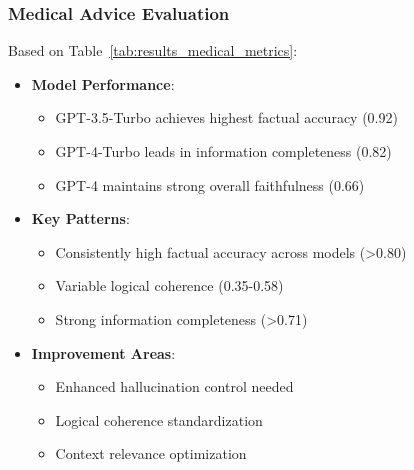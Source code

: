 \subsubsection{Medical Advice Evaluation}
Based on Table~\ref{tab:results_medical_metrics}:
\begin{itemize}
    \item \textbf{Model Performance}:
    \begin{itemize}
        \item GPT-3.5-Turbo achieves highest factual accuracy (0.92)
        \item GPT-4-Turbo leads in information completeness (0.82)
        \item GPT-4 maintains strong overall faithfulness (0.66)
    \end{itemize}
    \item \textbf{Key Patterns}:
    \begin{itemize}
        \item Consistently high factual accuracy across models (>0.80)
        \item Variable logical coherence (0.35-0.58)
        \item Strong information completeness (>0.71)
    \end{itemize}
    \item \textbf{Improvement Areas}:
    \begin{itemize}
        \item Enhanced hallucination control needed
        \item Logical coherence standardization
        \item Context relevance optimization
    \end{itemize}
\end{itemize}

